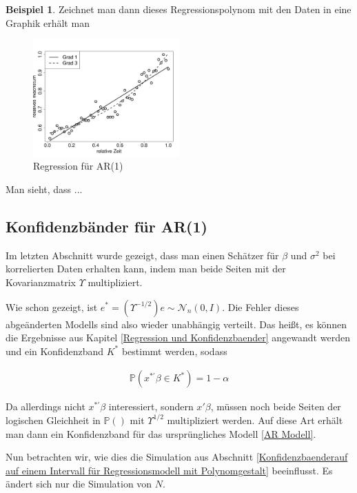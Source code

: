 \documentclass[12pt,a4paper]{article}
\theoremstyle{definition}
\newtheorem{Beispiel}[Definition]{Beispiel}
\theoremstyle{definition}
\theoremstyle{definition}
\theoremstyle{definition}
\begin{document}
\begin{Beispiel}
Zeichnet man dann dieses Regressionspolynom mit den Daten in eine Graphik erhält man

\begin{figure}[H] 
  \centering
     \includegraphics[width=0.5\textwidth]{Bsp-Reg-AR}
  \caption{Regression für AR(1)}
  \label{BSP-Reg-AR}
\end{figure}

Man sieht, dass ...

\end{Beispiel}




\subsection{Konfidenzbänder für AR(1)}
\label{Konfidenzbaender für AR(1)}
Im letzten Abschnitt wurde gezeigt, dass man einen Schätzer für $\beta$ und $\sigma^2$ bei korrelierten Daten erhalten kann, indem man beide Seiten mit der Kovarianzmatrix $\Upsilon$ multipliziert. 

Wie schon gezeigt, ist $e^{*} = (\Upsilon^{-1/2})e \sim \mathscr{N}_{n}(0,I)$. Die Fehler dieses abgeänderten Modells sind also wieder unabhängig verteilt. Das heißt, es können die Ergebnisse aus Kapitel \ref{Regression und Konfidenzbaender} angewandt werden und ein Konfidenzband $K^{*}$ bestimmt werden, sodass

\begin{align*}
\mathbb{P}(x^{*'} \beta \in K^{*}) = 1 - \alpha
\end{align*}

Da allerdings nicht $x^{*'} \beta$ interessiert, sondern $x' \beta$, müssen noch beide Seiten der logischen Gleichheit in $\mathbb{P}()$ mit $\Upsilon^{1/2}$ multipliziert werden. Auf diese Art erhält man dann ein Konfidenzband für das ursprüngliches Modell \eqref{AR Modell}.

Nun betrachten wir, wie dies die Simulation aus Abschnitt \ref{Konfidenzbaenderauf auf einem Intervall für Regressionsmodell mit Polynomgestalt} beeinflusst. Es ändert sich nur die Simulation von $N$.
\end{document}
